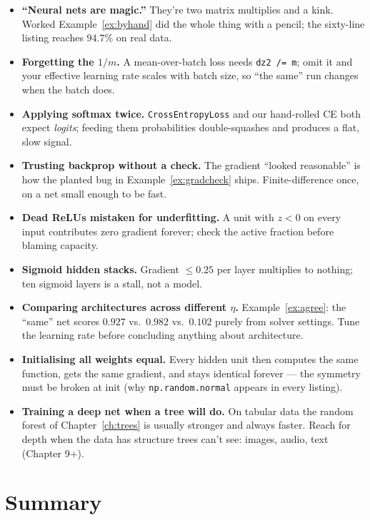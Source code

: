 \begin{itemize}
\item \textbf{``Neural nets are magic.''} They're two matrix multiplies
and a kink. Worked Example~\ref{ex:byhand} did the whole thing with a
pencil; the sixty-line listing reaches $94.7\%$ on real data.
\item \textbf{Forgetting the $1/m$.} A mean-over-batch loss needs
\texttt{dz2 /= m}; omit it and your effective learning rate scales with
batch size, so ``the same'' run changes when the batch does.
\item \textbf{Applying softmax twice.} \texttt{CrossEntropyLoss} and our
hand-rolled CE both expect \emph{logits}; feeding them probabilities
double-squashes and produces a flat, slow signal.
\item \textbf{Trusting backprop without a check.} The gradient
``looked reasonable'' is how the planted bug in Example~\ref{ex:gradcheck}
ships. Finite-difference once, on a net small enough to be fast.
\item \textbf{Dead ReLUs mistaken for underfitting.} A unit with
$z<0$ on every input contributes zero gradient forever; check the
active fraction before blaming capacity.
\item \textbf{Sigmoid hidden stacks.} Gradient $\le 0.25$ per layer
multiplies to nothing; ten sigmoid layers is a stall, not a model.
\item \textbf{Comparing architectures across different $\eta$.}
Example~\ref{ex:agree}: the ``same'' net scores $0.927$ vs.\ $0.982$
vs.\ $0.102$ purely from solver settings. Tune the learning rate before
concluding anything about architecture.
\item \textbf{Initialising all weights equal.} Every hidden unit then
computes the same function, gets the same gradient, and stays identical
forever --- the symmetry must be broken at init (why
\texttt{np.random.normal} appears in every listing).
\item \textbf{Training a deep net when a tree will do.} On tabular data
the random forest of Chapter~\ref{ch:trees} is usually stronger and
always faster. Reach for depth when the data has structure trees can't
see: images, audio, text (Chapter 9+).
\end{itemize}

\section{Summary}
\label{sec:nnsummary}

